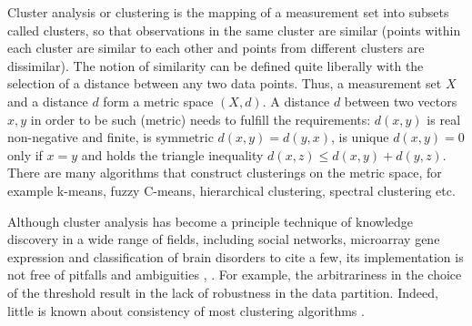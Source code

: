 \documentclass[onecollarge,runningheads]{svjour2}
\begin{document}
Cluster analysis or clustering is the mapping of a measurement set into subsets called clusters, so that observations in the same cluster are similar (points within each cluster are similar to each other and points from different clusters are dissimilar).
The notion of similarity can be defined quite liberally with the selection of a distance between any two data points. Thus, a measurement set $X$ and a distance $d$ form a metric space $(X,d)$. 
A distance $d$ between two vectors $x,y$ in order to be such (metric) needs to fulfill the requirements: $d(x,y)$ is real non-negative and finite, is symmetric $d(x,y)=d(y,x)$, is unique $d(x,y)=0$ only if $x=y$ and holds the triangle inequality $d(x,z) \leq  d(x,y) + d(y,z)$.
There are many algorithms that construct clusterings on the metric space, for example k-means, fuzzy C-means, hierarchical clustering, spectral clustering etc. 

Although cluster analysis has become a principle technique of knowledge discovery in a wide range of fields, including social networks, microarray gene expression \citep{nugent2010overview} and classification of brain disorders \citep{arbabshirani2017single} to cite a few, its implementation is not free of pitfalls and ambiguities \citep{carlsson2009topology}, \citep{ronan2016avoiding}.
For example, the arbitrariness in the choice of the threshold result in the lack of robustness in the data partition. Indeed, little is known
about consistency of most clustering algorithms \citep{von2008consistency}.
\end{document}
